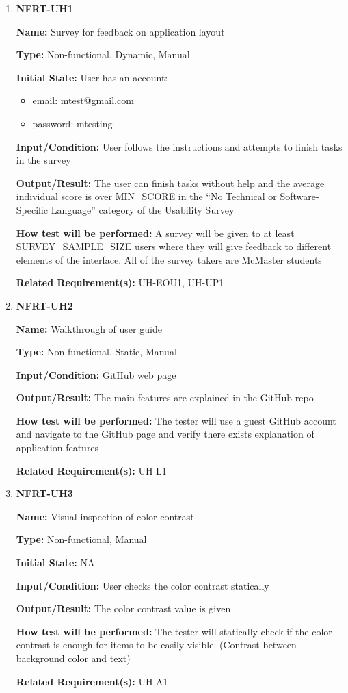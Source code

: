 \documentclass[12pt, titlepage]{article}
\begin{document}
\begin{enumerate}
\item{\textbf{NFRT-UH1}}

\textbf{Name:} Survey for feedback on application layout

\textbf{Type:} Non-functional, Dynamic, Manual
					
\textbf{Initial State:} User has an account:
\begin{itemize}
\item email: mtest@gmail.com
\item password: mtesting
\end{itemize}

\textbf{Input/Condition:} User follows the instructions and attempts to finish tasks in the survey 
					
\textbf{Output/Result:} The user can finish tasks without help and the average individual score is over MIN\_SCORE in the ``No Technical or Software-Specific Language'' category of the Usability Survey
					
\textbf{How test will be performed:} A survey will be given to at least
SURVEY\_SAMPLE\_SIZE users where they will give feedback to different elements of the interface. All of the survey takers are McMaster students

\textbf{Related Requirement(s):} UH-EOU1, UH-UP1

\item{\textbf{NFRT-UH2}}

\textbf{Name:} Walkthrough of user guide 

\textbf{Type:} Non-functional, Static, Manual
					
\textbf{Input/Condition:} GitHub web page
					
\textbf{Output/Result:} The main features are explained in the GitHub repo

\textbf{How test will be performed:} The tester will use a guest GitHub account and navigate to the GitHub page and verify there exists explanation of application features

\textbf{Related Requirement(s):} UH-L1

\item{\textbf{NFRT-UH3}}

\textbf{Name:} Visual inspection of color contrast 

\textbf{Type:} Non-functional, Manual
					
\textbf{Initial State:} NA
					
\textbf{Input/Condition:} User checks the color contrast statically
					
\textbf{Output/Result:} The color contrast value is given

\textbf{How test will be performed:} The tester will statically check if the color contrast is enough for items to be easily visible. (Contrast between background color and text)

\textbf{Related Requirement(s):} UH-A1
\end{enumerate}
\end{document}
